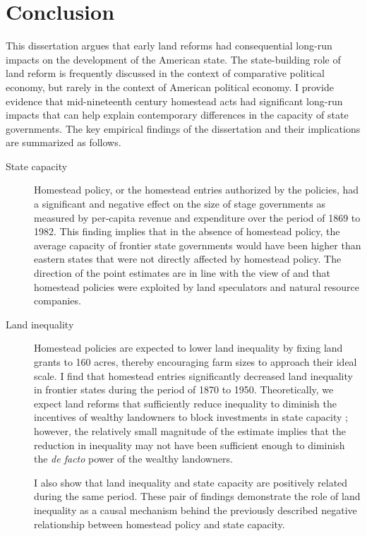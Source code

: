 \chapter{Conclusion} \label{diss-conclusion}

This dissertation argues that early land reforms had consequential long-run impacts on the development of the American state. The state-building role of land reform is frequently discussed in the context of comparative political economy, but rarely in the context of American political economy. I provide evidence that mid-nineteenth century homestead acts had significant long-run impacts that can help explain contemporary differences in the capacity of state governments. The key empirical findings of the dissertation and their implications are summarized as follows.

\begin{description}
	\item[State capacity] Homestead policy, or the homestead entries authorized by the policies, had a significant and negative effect on the size of stage governments as measured by per-capita revenue and expenditure over the period of 1869 to 1982. This finding implies that in the absence of homestead policy, the average capacity of frontier state governments would have been higher than eastern states that were not directly affected by homestead policy. The direction of the point estimates are in line with the view of \citet{gates1968history} and \citet{murtazashvili2013political} that homestead policies were exploited by land speculators and natural resource companies. 
	\item[Land inequality] Homestead policies are expected to lower land inequality by fixing land grants to 160 acres, thereby encouraging farm sizes to approach their ideal scale. I find that homestead entries significantly decreased land inequality in frontier states during the period of 1870 to 1950. Theoretically, we expect land reforms that sufficiently reduce inequality to diminish the incentives of wealthy landowners to block investments in state capacity \citep{besley2009origins,galor2009inequality}; however, the relatively small magnitude of the estimate implies that the reduction in inequality may not have been sufficient enough to diminish the \emph{de facto} power of the wealthy landowners. 
	
	I also show that land inequality and state capacity are positively related during the same period. These pair of findings demonstrate the role of land inequality as a causal mechanism behind the previously described negative relationship between homestead policy and state capacity. 
	

\end{description}
